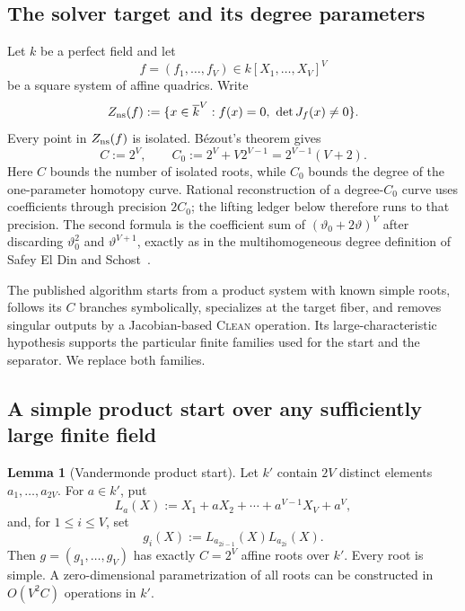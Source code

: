 \documentclass[11pt,a4paper]{article}
\theoremstyle{definition}
\newtheorem{lemma}[theorem]{Lemma}
\theoremstyle{remark}
\begin{document}
\subsection{The solver target and its degree parameters}
Let $k$ be a perfect field and let
\[
 f=(f_1,\ldots,f_V)\in k[X_1,\ldots,X_V]^V
\]
be a square system of affine quadrics.  Write
\begin{equation}\label{eq:ns-locus}
 Z_{\rm ns}(f)
 :=\{x\in\overline k^V:f(x)=0,\ \det J_f(x)\ne0\}.
\end{equation}
Every point in $Z_{\rm ns}(f)$ is isolated.  B\'ezout's theorem gives
\begin{equation}\label{eq:C-C0}
 C:=2^V,
 \qquad
 C_0:=2^V+V2^{V-1}=2^{V-1}(V+2).
\end{equation}
Here $C$ bounds the number of isolated roots, while $C_0$ bounds the degree of the one-parameter homotopy curve.  Rational reconstruction of a degree-$C_0$ curve uses coefficients through precision $2C_0$; the lifting ledger below therefore runs to that precision.  The second formula is the coefficient sum of
$(\vartheta_0+2\vartheta)^V$ after discarding $\vartheta_0^2$ and $\vartheta^{V+1}$, exactly as in the multihomogeneous degree definition of Safey El Din and Schost~\cite{SafeySchost2018}.

The published algorithm starts from a product system with known simple roots, follows its $C$ branches symbolically, specializes at the target fiber, and removes singular outputs by a Jacobian-based \textsc{Clean} operation.  Its large-characteristic hypothesis supports the particular finite families used for the start and the separator.  We replace both families.

\subsection{A simple product start over any sufficiently large finite field}

\begin{lemma}[Vandermonde product start]\label{lem:ff-vandermonde-start}
Let $k'$ contain $2V$ distinct elements $a_1,\ldots,a_{2V}$.  For $a\in k'$, put
\begin{equation}\label{eq:La}
 L_a(X):=X_1+aX_2+\cdots+a^{V-1}X_V+a^V,
\end{equation}
and, for $1\le i\le V$, set
\begin{equation}\label{eq:vandermonde-start}
 g_i(X):=L_{a_{2i-1}}(X)L_{a_{2i}}(X).
\end{equation}
Then $g=(g_1,\ldots,g_V)$ has exactly $C=2^V$ affine roots over $k'$.  Every root is simple.  A zero-dimensional parametrization of all roots can be constructed in $O(V^2C)$ operations in $k'$.
\end{lemma}
\end{document}
